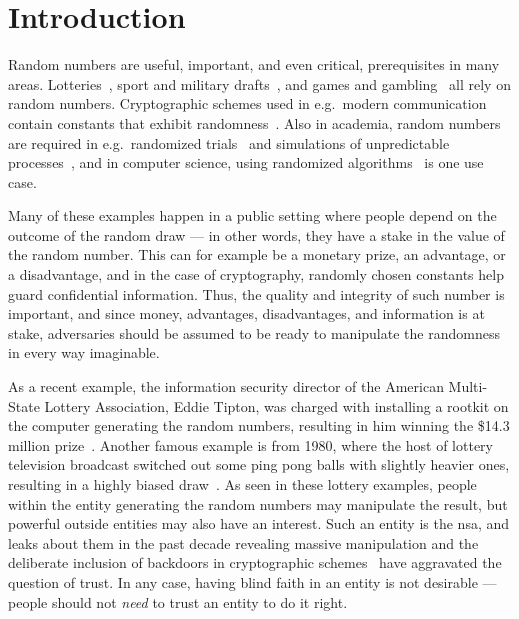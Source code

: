 \section{Introduction}\label{cha:introduction}

Random numbers are useful, important, and even critical, prerequisites in many areas.
Lotteries~\cite{grumbach2017distributed}, sport and military drafts~\cite{nbalottery, starr1997nonrandom}, and games and gambling~\cite{randomnumbersgames} all rely on random numbers.
Cryptographic schemes used in e.g.\ modern communication contain constants that exhibit randomness~\cite{baigneres2015trap}.
Also in academia, random numbers are required in e.g.\ randomized trials~\cite{kim2014random} and simulations of unpredictable processes~\cite{heath2002scientific}, and in computer science, using randomized algorithms~\cite[Section~5.3]{cormen2009introduction} is one use case.

Many of these examples happen in a public setting where people depend on the outcome of the random draw --- in other words, they have a stake in the value of the random number.
This can for example be a monetary prize, an advantage, or a disadvantage, and in the case of cryptography, randomly chosen constants help guard confidential information.
Thus, the quality and integrity of such number is important, and since money, advantages, disadvantages, and information is at stake, adversaries should be assumed to be ready to manipulate the randomness in every way imaginable.

As a recent example, the information security director of the American Multi-State Lottery Association, Eddie Tipton, was charged with installing a rootkit on the computer generating the random numbers, resulting in him winning the \$14.3 million prize~\cite{lotteryscandal-eddietipton}.
Another famous example is from 1980, where the host of lottery television broadcast switched out some ping pong balls with slightly heavier ones, resulting in a highly biased draw~\cite{lotteryscandal-666}.
As seen in these lottery examples, people within the entity generating the random numbers may manipulate the result, but powerful outside entities may also have an interest.
Such an entity is the \gls{nsa}, and leaks about them in the past decade revealing massive manipulation and the deliberate inclusion of backdoors in cryptographic schemes~\cite{nytimes-nsabackdoors} have aggravated the question of trust.
In any case, having blind faith in an entity is not desirable --- people should not \emph{need} to trust an entity to do it right.

